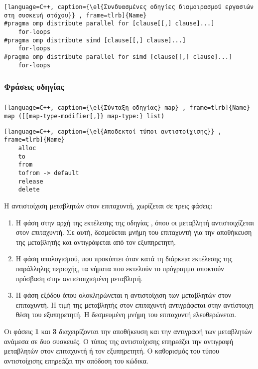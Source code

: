 \clearpage
{}
\begin{lstlisting}[language=C++, caption={\el{Συνδυασμένες οδηγίες διαμοιρασμού εργασιών στη συσκευή στόχου}} , frame=tlrb]{Name}
#pragma omp distribute parallel for [clause[[,] clause]...]
	for-loops
#pragma omp distribute simd [clause[[,] clause]...]
	for-loops
#pragma omp distribute parallel for simd [clause[[,] clause]...]
	for-loops
\end{lstlisting}

\subsubsection{Φράσεις οδηγίας \emph{}}
\subparagraph{}
\begin{lstlisting}[language=C++, caption={\el{Σύνταξη οδηγίας} map} , frame=tlrb]{Name}
map ([[map-type-modifier[,}} map-type:} list)

\end{lstlisting}
\begin{lstlisting}[language=C++, caption={\el{Αποδεκτοί τύποι αντιστοίχισης}} , frame=tlrb]{Name}
	alloc
	to
	from
	tofrom -> default
	release
	delete
\end{lstlisting}

Η αντιστοίχιση μεταβλητών στον επιταχυντή, χωρίζεται σε τρεις φάσεις:
\begin{enumerate}
  \item Η φάση \emph{} στην αρχή της εκτέλεσης της οδηγίας \emph{}, όπου οι μεταβλητή αντιστοιχίζεται στον επιταχυντή. Σε αυτή, δεσμεύεται μνήμη του επιταχυντή για την αποθήκευση της μεταβλητής και αντιγράφεται από τον εξυπηρετητή.
  \item Η φάση υπολογισμού, που προκύπτει όταν κατά τη διάρκεια εκτέλεσης της παράλληλης περιοχής, τα νήματα που εκτελούν το πρόγραμμα αποκτούν πρόσβαση στην αντιστοιχισμένη μεταβλητή.
  \item Η φάση εξόδου όπου ολοκληρώνεται η αντιστοίχιση των μεταβλητών στον επιταχυντή. Η τιμή της μεταβλητής στον επιταχυντή αντιγράφεται στην αντίστοιχη θέση του εξυπηρετητή. Η δεσμευμένη μνήμη του επιταχυντή ελευθερώνεται.
\end{enumerate}

Οι φάσεις \textbf{1} και \textbf{3} διαχειρίζονται την αποθήκευση και την αντιγραφή των μεταβλητών ανάμεσα σε δυο συσκευές. Ο τύπος της αντιστοίχισης επηρεάζει την αντιγραφή μεταβλητών στον επιταχυντή ή τον εξυπηρετητή. Ο καθορισμός του τύπου αντιστοίχισης επηρεάζει την απόδοση του κώδικα.
\clearpage

